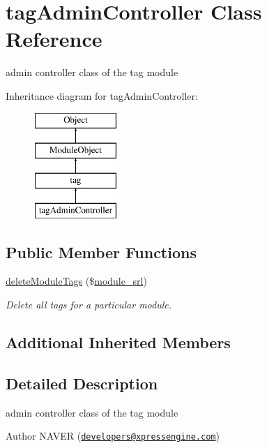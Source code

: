 \hypertarget{classtagAdminController}{\section{tag\-Admin\-Controller Class Reference}
\label{classtagAdminController}
}


admin controller class of the tag module  


Inheritance diagram for tag\-Admin\-Controller\-:\begin{figure}[H]
\begin{center}
\leavevmode
\includegraphics[height=4.000000cm]{classtagAdminController}
\end{center}
\end{figure}
\subsection*{Public Member Functions}
\begin{DoxyCompactItemize}
\item 
\hyperlink{classtagAdminController_a26a0cf3fda1e1d57de9810e76dd72765}{delete\-Module\-Tags} (\$\hyperlink{ko_8install_8php_a370bb6450fab1da3e0ed9f484a38b761}{module\-\_\-srl})
\begin{DoxyCompactList}\small\item\em Delete all tags for a particular module. \end{DoxyCompactList}\end{DoxyCompactItemize}
\subsection*{Additional Inherited Members}


\subsection{Detailed Description}
admin controller class of the tag module 

\begin{DoxyAuthor}{Author}
N\-A\-V\-E\-R (\href{mailto:developers@xpressengine.com}{\tt developers@xpressengine.\-com}) 
\end{DoxyAuthor}



